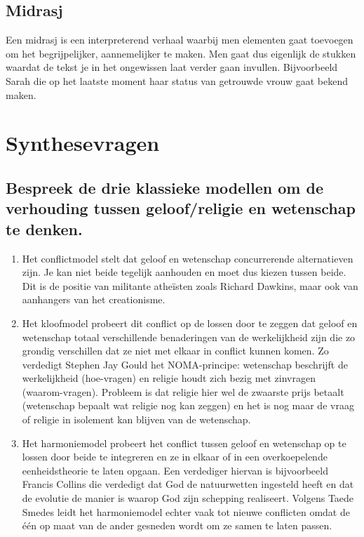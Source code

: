 \documentclass[11pt,a4paper,titlepage]{article}
\begin{document}
\subsection{Midrasj}
Een midrasj is een interpreterend verhaal waarbij men elementen gaat toevoegen om het begrijpelijker, aannemelijker te maken. Men gaat dus eigenlijk de stukken waardat de tekst je in het ongewissen laat verder gaan invullen. Bijvoorbeeld Sarah die op het laatste moment haar status van getrouwde vrouw gaat bekend maken.


\section{Synthesevragen}

\subsection{Bespreek de drie klassieke modellen om de verhouding tussen geloof/religie en wetenschap te denken. }
\begin{enumerate}
\item Het conflictmodel stelt dat geloof en wetenschap concurrerende alternatieven zijn. Je kan niet beide tegelijk aanhouden en moet dus kiezen tussen beide. Dit is de positie van militante atheïsten zoals Richard Dawkins, maar ook van aanhangers van het creationisme. 
\item Het kloofmodel probeert dit conflict op de lossen door te zeggen dat geloof en wetenschap totaal verschillende benaderingen van de werkelijkheid zijn die zo grondig verschillen dat ze niet met elkaar in conflict kunnen komen. Zo verdedigt Stephen Jay Gould het NOMA-principe: wetenschap beschrijft de werkelijkheid (hoe-vragen) en religie houdt zich bezig met zinvragen (waarom-vragen). Probleem is dat religie hier wel de zwaarste prijs betaalt (wetenschap bepaalt wat
religie nog kan zeggen) en het is nog maar de vraag of religie in isolement kan blijven van de wetenschap.
\item Het harmoniemodel probeert het conflict tussen geloof en wetenschap op te lossen door beide te integreren en ze in elkaar of in een overkoepelende eenheidstheorie te laten opgaan. Een verdediger hiervan is bijvoorbeeld Francis Collins die verdedigt dat God de natuurwetten ingesteld heeft en dat de evolutie de manier is waarop God zijn schepping realiseert. Volgens Taede Smedes leidt het harmoniemodel echter vaak tot nieuwe conflicten omdat de één op maat van de ander gesneden wordt om ze samen te laten passen.
\end{enumerate}
\end{document}
